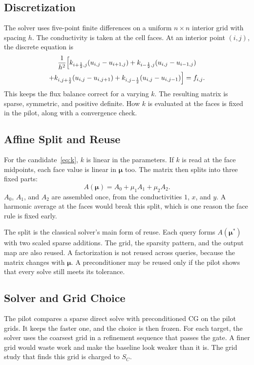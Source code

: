 \documentclass[journal]{IEEEtran}
\begin{document}
\subsection{Discretization}
The solver uses five-point finite differences on a uniform $n\times n$ interior grid with spacing $h$. The conductivity is taken at the cell faces. At an interior point $(i,j)$, the discrete equation is
\begin{multline}
\frac{1}{h^{2}}\Bigl[k_{i+\frac12,j}(u_{i,j}-u_{i+1,j})+k_{i-\frac12,j}(u_{i,j}-u_{i-1,j})\\
+k_{i,j+\frac12}(u_{i,j}-u_{i,j+1})+k_{i,j-\frac12}(u_{i,j}-u_{i,j-1})\Bigr]=f_{i,j}.
\label{eq:stencil}
\end{multline}
This keeps the flux balance correct for a varying $k$. The resulting matrix is sparse, symmetric, and positive definite. How $k$ is evaluated at the faces is fixed in the pilot, along with a convergence check.

\subsection{Affine Split and Reuse}
For the candidate~\eqref{eq:k}, $k$ is linear in the parameters. If $k$ is read at the face midpoints, each face value is linear in $\boldsymbol{\mu}$ too. The matrix then splits into three fixed parts:
\begin{equation}
A(\boldsymbol{\mu})=A_0+\mu_1A_1+\mu_2A_2 .
\label{eq:affine}
\end{equation}
$A_0$, $A_1$, and $A_2$ are assembled once, from the conductivities $1$, $x$, and $y$. A harmonic average at the faces would break this split, which is one reason the face rule is fixed early.

The split is the classical solver's main form of reuse. Each query forms $A(\boldsymbol{\mu}^\ast)$ with two scaled sparse additions. The grid, the sparsity pattern, and the output map are also reused. A factorization is not reused across queries, because the matrix changes with $\boldsymbol{\mu}$. A preconditioner may be reused only if the pilot shows that every solve still meets its tolerance.

\subsection{Solver and Grid Choice}
The pilot compares a sparse direct solve with preconditioned CG on the pilot grids. It keeps the faster one, and the choice is then frozen. For each target, the solver uses the coarsest grid in a refinement sequence that passes the gate. A finer grid would waste work and make the baseline look weaker than it is. The grid study that finds this grid is charged to $S_C$.
\end{document}
